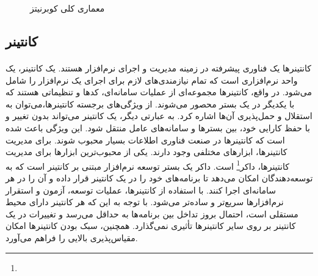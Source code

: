 {\begin{enumerate}
    \end{enumerate}
    \begin{figure}[H]
        \caption{معماری کلی کوبرنیتز}
        \label{fig:kube_compontents}
    \end{figure}
}

\subsection{کانتینر‌}
\label{subsec:containers}
\paragraph{}
{
    کانتینرها یک فناوری پیشرفته در زمینه مدیریت و اجرای نرم‌افزار هستند. یک کانتینر، یک واحد نرم‌افزاری است که تمام نیازمندی‌های
    لازم برای اجرای یک نرم‌افزار را شامل می‌شود. در واقع، کانتینرها مجموعه‌ای از عملیات سامانه‌ای، کدها و تنظیماتی هستند که با 
    یکدیگر در یک بستر محصور می‌شوند. از ویژگی‌های برجسته کانتینرها،می‌توان به استقلال و حمل‌پذیری آن‌ها اشاره کرد. به عبارتی دیگر،
    یک کانتینر می‌تواند بدون تغییر و با حفظ کارایی خود، بین بستر‌ها و سامانه‌‌های عامل‌ منتقل شود. این ویژگی باعث شده است که کانتینرها
    در صنعت فناوری اطلاعات بسیار محبوب شوند. برای مدیریت کانتینرها، ابزارهای مختلفی وجود دارند. یکی از محبوب‌ترین ابزارها برای مدیریت کانتینرها،
    داکر\footnote{}
    است. داکر یک بستر توسعه نرم‌افزار مبتنی بر کانتینر است که به توسعه‌دهندگان امکان می‌دهد تا برنامه‌های خود را در یک کانتینر قرار داده و آن را در
    هر سامانه‌ای اجرا کنند. با استفاده از کانتینرها، عملیات توسعه، آزمون و استقرار نرم‌افزارها سریع‌تر و ساده‌تر می‌شود. با توجه به این که هر کانتینر
    دارای محیط مستقلی است، احتمال بروز تداخل بین برنامه‌ها به حداقل می‌رسد و تغییرات در یک کانتینر بر روی سایر کانتینرها تأثیری نمی‌گذارد. همچنین،
    سبک بودن کانتینرها امکان مقیاس‌پذیری بالایی را فراهم می‌آورد.
}

